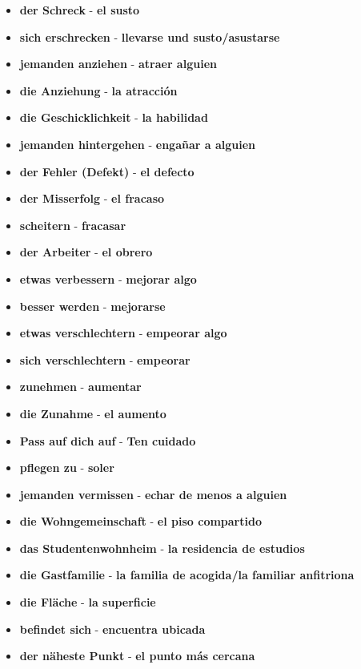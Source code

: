 \documentclass{article}
\begin{document}
\begin{multicols}{2}
\begin{itemize}
		\item{\textbf{der Schreck} - \textbf{el susto}}
		\item{\textbf{sich erschrecken} - \textbf{llevarse und susto/asustarse}}
		\item{\textbf{jemanden anziehen} - \textbf{atraer alguien}}
		\item{\textbf{die Anziehung} - \textbf{la atracción}}
		\item{\textbf{die Geschicklichkeit} - \textbf{la habilidad}}
		\item{\textbf{jemanden hintergehen} - \textbf{engañar a alguien}}
		\item{\textbf{der Fehler (Defekt)} - \textbf{el defecto}}
		\item{\textbf{der Misserfolg} - \textbf{el fracaso}}
		\item{\textbf{scheitern} - \textbf{fracasar}}
		\item{\textbf{der Arbeiter} - \textbf{el obrero}}
		\item{\textbf{etwas verbessern} - \textbf{mejorar algo}}
		\item{\textbf{besser werden} - \textbf{mejorarse}}
		\item{\textbf{etwas verschlechtern} - \textbf{empeorar algo}}
		\item{\textbf{sich verschlechtern} - \textbf{empeorar}}
		\item{\textbf{zunehmen} - \textbf{aumentar}}
		\item{\textbf{die Zunahme} - \textbf{el aumento}}
		\item{\textbf{Pass auf dich auf} - \textbf{Ten cuidado}}
		\item{\textbf{pflegen zu} - \textbf{soler}}
		\item{\textbf{jemanden vermissen} - \textbf{echar de menos a alguien}}
		\item{\textbf{die Wohngemeinschaft} - \textbf{el piso compartido}}
		\item{\textbf{das Studentenwohnheim} - \textbf{la residencia de estudios}}
		\item{\textbf{die Gastfamilie} - \textbf{la familia de acogida/la familiar anfitriona}}
	\end{itemize}
	\newpage
	\begin{itemize}
		\item{\textbf{die Fläche} - \textbf{la superficie}}
		\item{\textbf{befindet sich} - \textbf{encuentra ubicada}}
		\item{\textbf{der näheste Punkt} - \textbf{el punto más cercana}}

\end{itemize}
\end{multicols}
\end{document}
